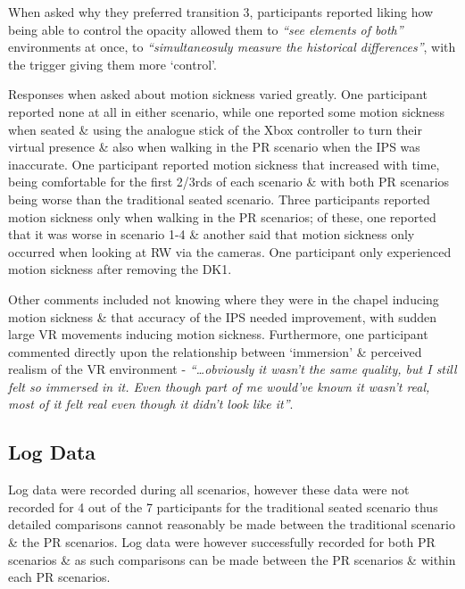 When asked why they preferred transition 3, participants reported liking how being able to control the opacity allowed them to \textit{``see elements of both''} environments at once, to \textit{``simultaneosuly measure the historical differences''}, with the trigger giving them more `control'.

Responses when asked about motion sickness varied greatly. One participant reported none at all in either scenario, while one reported some motion sickness when seated \& using the analogue stick of the Xbox controller to turn their virtual presence \& also when walking in the PR scenario when the IPS was inaccurate. One participant reported motion sickness that increased with time, being comfortable for the first 2/3rds of each scenario \& with both PR scenarios being worse than the traditional seated scenario. Three participants reported motion sickness only when walking in the PR scenarios; of these, one reported that it was worse in scenario 1-4 \& another said that motion sickness only occurred when looking at RW via the cameras. One participant only experienced motion sickness after removing the DK1.

Other comments included not knowing where they were in the chapel inducing motion sickness \& that accuracy of the IPS needed improvement, with sudden large VR movements inducing motion sickness. Furthermore, one participant commented directly upon the relationship between `immersion' \& perceived realism of the VR environment - \textit{``\ldots obviously it wasn't the same quality, but I still felt so immersed in it. Even though part of me would've known it wasn't real, most of it felt real even though it didn't look like it''}.


\subsection{Log Data}
\label{2-1-log-data}

Log data were recorded during all scenarios, however these data were not recorded for 4 out of the 7 participants for the traditional seated scenario thus detailed comparisons cannot reasonably be made between the traditional scenario \& the PR scenarios. Log data were however successfully recorded for both PR scenarios \& as such comparisons can be made between the PR scenarios \& within each PR scenarios.

